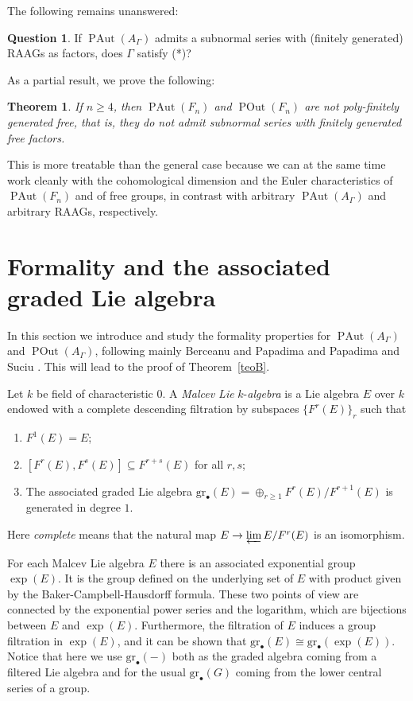 \documentclass[10pt]{amsart}
\newtheorem{teo}{Theorem}
\theoremstyle{definition}
\newtheorem*{question*}{Question}
\newcommand{\PAut}{\operatorname{PAut}}
\newcommand{\POut}{\operatorname {POut}}
\newcommand{\gr}{\mathrm{gr}_\bullet}
\theoremstyle{definition}
\numberwithin{equation}{section}
\begin{document}
 The following remains unanswered:

 \begin{question*}
  If $\PAut(A_\Gamma)$ admits a subnormal series with (finitely generated) RAAGs as factors, does $\Gamma$ satisfy (*)?
 \end{question*}

As a partial result, we prove the following:

\begin{teo} \label{teoE}
 If $n \geq 4$, then $\PAut(F_n)$ and $\POut(F_n)$ are not poly-finitely generated free, that is, they do not admit  subnormal series with finitely generated free factors.
\end{teo}

This is more treatable than the general case because we can at the same time work cleanly with the cohomological dimension and the Euler characteristics of $\PAut(F_n)$ and of free groups, in contrast with arbitrary $\PAut(A_{\Gamma})$ and arbitrary RAAGs, respectively.



\section{Formality and the associated graded Lie algebra}  \label{sec.formality}
In this section we introduce and study the formality properties for $\PAut(A_{\Gamma})$ and $\POut(A_\Gamma)$, following mainly Berceanu and Papadima\cite{BerceanuPapadima} and Papadima and Suciu \cite{PapadimaSuciu}. This will lead to the proof of Theorem~\ref{teoB}.

Let $k$ be field of characteristic $0$. A \textit{Malcev Lie} $k$-\textit{algebra} is a Lie algebra $E$ over $k$ endowed with a complete descending filtration by subspaces $\{F^r(E)\}_r$ such that
\begin{enumerate}
 \item $F^1(E) = E$;
 \item $[F^r(E), F^s(E)] \subseteq F^{r+s}(E)$ for all $r,s$;
 \item The associated graded Lie algebra $\gr(E) = \oplus_{r \geq 1} F^{r}(E)/F^{r+1}(E)$ is generated in degree $1$.
\end{enumerate}
Here \emph{complete} means that the natural map $E \to \varprojlim E/F^r(E)$ is an isomorphism.

For each Malcev Lie algebra $E$ there is an associated exponential group $\exp(E)$. It is
the group defined on the underlying set of $E$ with product given by the Baker-Campbell-Hausdorff formula.  These two points of view are connected by the
exponential power series and the logarithm, which are bijections between $E$ and $\exp(E)$. %
Furthermore, the filtration of $E$ induces a group filtration in $\exp(E)$, and it can be shown that $\gr(E) \cong \gr(\exp(E))$. Notice that here we use $\gr(-)$ both as the graded algebra coming from a filtered Lie algebra and for the usual $\gr(G)$ coming from the lower central series of a group.
\end{document}
